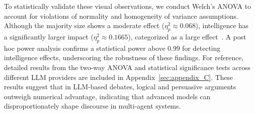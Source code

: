 \documentclass[11pt]{article}
\begin{document}
To statistically validate these visual observations, we conduct Welch’s ANOVA to account for violations of normality and homogeneity of variance assumptions. Although the majority size shows a moderate effect (\textit{\(\eta_p^2 \approx 0.068\)}), intelligence has a significantly larger impact (\textit{\(\eta_p^2 \approx 0.1665\)}), categorized as a large effect~\citep{cohen2013statistical}. A post hoc power analysis confirms a statistical power above 0.99 for detecting intelligence effects, underscoring the robustness of these findings. For reference, detailed results from the two-way ANOVA and statistical significance tests across different LLM providers are included in Appendix~\ref{sec:appendix_C}. These results suggest that in LLM-based debates, logical and persuasive arguments outweigh numerical advantage, indicating that advanced models can disproportionately shape discourse in multi-agent systems.



\end{document}
